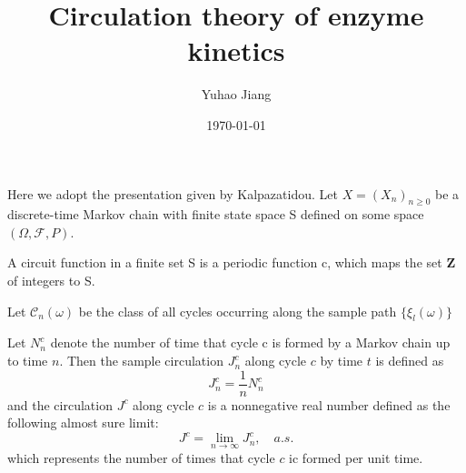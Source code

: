 \documentclass[11pt,en,cite=authoryear]{elegantpaper}
\title{Circulation theory of enzyme kinetics}
\author{Yuhao Jiang}
\date{\today}
\begin{document}
\maketitle

Here we adopt the presentation given by Kalpazatidou.
Let $X=(X_n)_{n\ge 0}$ be a discrete-time Markov chain with finite state space S defined on some space $(\Omega, \mathcal{F}, P)$. \\

\begin{definition}
    A circuit function in a finite set S is a periodic function c, which maps the set $\mathbf{Z}$ of integers to S.
\end{definition}


\begin{definition}
    Let $\mathcal{C}_n(\omega)$ be the class of all cycles occurring along the sample path $\{\xi_l(\omega)\}$
\end{definition}



\begin{definition} %
    Let $N_n^c$ denote the number of time that cycle c is formed by a Markov chain up to time $n$. Then the sample circulation $J_n^c$ along cycle $c$ by time $t$ is defined as
    $$
    J_n^c = \frac{1}{n} N_n^c
    $$
    and the circulation $J^c$ along cycle $c$ is a nonnegative real number defined as the following almost sure limit:
    $$
    J^c = \lim_{n \rightarrow \infty} J_n^c, \quad a.s.
    $$
    which represents the number of times that cycle $c$ ic formed per unit time.
\end{definition}
\end{document}

